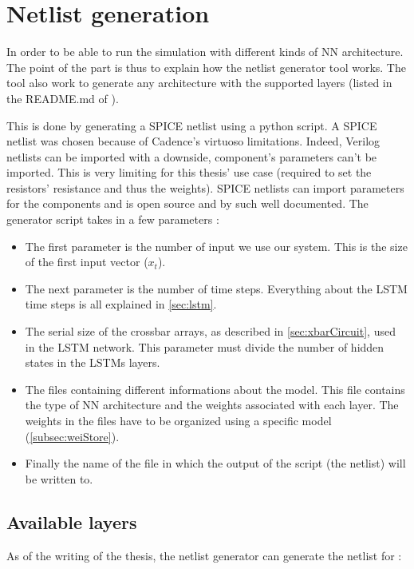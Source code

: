 \section{Netlist generation}
\label{sec:netlist}

In order to be able to run the simulation with different kinds of \ac{NN} architecture. The point of the part is thus to explain how the netlist generator tool works. The tool also work to generate any architecture with the supported layers (listed in the README.md of \cite{lstmGen}).

This is done by generating a SPICE netlist using a python script. A SPICE netlist was chosen because of Cadence's virtuoso limitations. Indeed, Verilog netlists can be imported with a downside, component's parameters can't be imported. This is very limiting for this thesis' use case (required to set the resistors' resistance and thus the weights). SPICE netlists can import parameters for the components and is open source and by such well documented. The generator script takes in a few parameters :

\begin{itemize}
  \item The first parameter is the number of input we use our system. This is the size of the first input vector ($x_t$).
  \item The next parameter is the number of time steps. Everything about the \ac{LSTM} time steps is all explained in \cref{sec:lstm}.
  \item The serial size of the crossbar arrays, as described in \cref{sec:xbarCircuit}, used in the \ac{LSTM} network. This parameter must divide the number of hidden states in the \acp{LSTM} layers.
  \item The files containing different informations about the model. This file contains the type of \ac{NN} architecture and the weights associated with each layer. The weights in the files have to be organized using a specific model (\cref{subsec:weiStore}).
  \item Finally the name of the file in which the output of the script (the netlist) will be written to.
\end{itemize}

\subsection{Available layers}

As of the writing of the thesis, the netlist generator can generate the netlist for :

